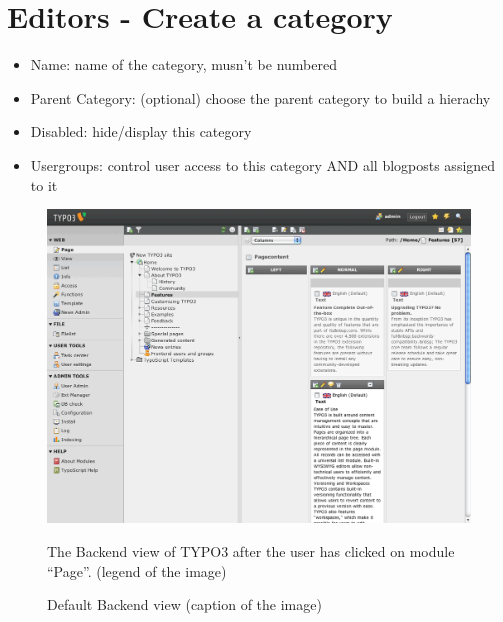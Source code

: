 \documentclass[a4paper,10pt,english]{sphinxmanual}
\begin{document}
\section{Editors - Create a category}
\label{UsersManual/Index:editors-create-a-category}\begin{itemize}
\item {} 
Name: name of the category, musn't be numbered

\item {} 
Parent Category: (optional) choose the parent category to build a hierachy

\item {} 
Disabled: hide/display this category

\item {} 
Usergroups: control user access to this category AND all blogposts assigned to it

\end{itemize}
\begin{figure}[htbp]
\centering
\capstart

\includegraphics{BackendView.png}
\caption{Default Backend view (caption of the image)}{\small 
The Backend view of TYPO3 after the user has clicked on module ``Page''. (legend of the image)
}\end{figure}
\end{document}

